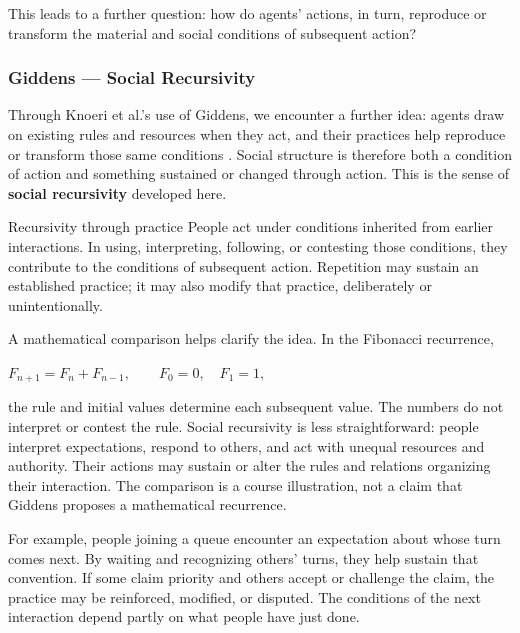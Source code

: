 \documentclass[11pt,a4paper]{article}
\newenvironment{fitdisplay}{\par\medskip\noindent\begin{lrbox}{\displaybox}$\displaystyle}{%
$\end{lrbox}\makebox[\linewidth][c]{\ifdim\wd\displaybox>\linewidth\resizebox{\linewidth}{!}{\usebox{\displaybox}}\else\usebox{\displaybox}\fi}\par\medskip}
\begin{document}
This leads to a further question: how do agents' actions, in turn, reproduce or transform the material and social conditions of subsequent action?

\subsubsection{Giddens --- Social Recursivity}

Through Knoeri et al.'s use of Giddens, we encounter a further idea: agents draw on existing rules and resources when they act, and their practices help reproduce or transform those same conditions \cite{knoeri}. Social structure is therefore both a condition of action and something sustained or changed through action. This is the sense of \textbf{social recursivity} developed here.

\begin{principle}{Recursivity through practice}
People act under conditions inherited from earlier interactions. In using, interpreting, following, or contesting those conditions, they contribute to the conditions of subsequent action. Repetition may sustain an established practice; it may also modify that practice, deliberately or unintentionally.
\end{principle}

A mathematical comparison helps clarify the idea. In the Fibonacci recurrence,
\begin{fitdisplay}
F_{n+1}=F_n+F_{n-1},\qquad F_0=0,\quad F_1=1,
\end{fitdisplay}
the rule and initial values determine each subsequent value. The numbers do not interpret or contest the rule. Social recursivity is less straightforward: people interpret expectations, respond to others, and act with unequal resources and authority. Their actions may sustain or alter the rules and relations organizing their interaction. The comparison is a course illustration, not a claim that Giddens proposes a mathematical recurrence.

For example, people joining a queue encounter an expectation about whose turn comes next. By waiting and recognizing others' turns, they help sustain that convention. If some claim priority and others accept or challenge the claim, the practice may be reinforced, modified, or disputed. The conditions of the next interaction depend partly on what people have just done.
\end{document}
